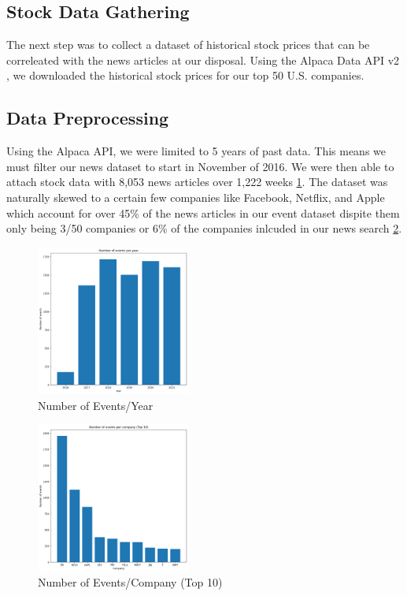 \documentclass[conference]{IEEEtran}
\begin{document}
\subsection{Stock Data Gathering}
The next step was to collect a dataset of historical stock prices that can be correleated with the news articles at our disposal. Using the Alpaca Data API v2 \cite{alpacadataapi}, we downloaded the historical stock prices for our top 50 U.S. companies. 
\subsection{Data Preprocessing}
Using the Alpaca API, we were limited to 5 years of past data. This means we must filter our news dataset to start in November of 2016. We were then able to attach stock data with 8,053 news articles over 1,222 weeks \ref{fig:eventsPerYear}. The dataset was naturally skewed to a certain few companies like Facebook, Netflix, and Apple which account for over 45\% of the news articles in our event dataset dispite them only being 3/50 companies or 6\% of the companies inlcuded in our news search \ref{fig:eventsPerCompany}. 
\begin{figure}[ht]
	\centering
	\includegraphics[width=0.45\textwidth]{eventsPerYear.png}
	\caption{Number of Events/Year}
	\label{fig:eventsPerYear}
\end{figure}
\begin{figure}[ht]
	\centering
	\includegraphics[width=0.45\textwidth]{eventsPerCompany.png}
	\caption{Number of Events/Company (Top 10)}
	\label{fig:eventsPerCompany}
\end{figure}
\end{document}
